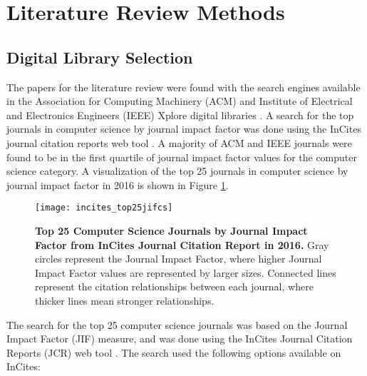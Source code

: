 



\appendix

\section{Literature Review Methods}  \label{appendix:literature-review-methods}

\subsection{Digital Library Selection} \label{appendix:digital-library-selection}

The papers for the literature review were found with the search engines available in the Association for Computing Machinery (ACM) \cite{ACM:2017} and Institute of Electrical and Electronics Engineers (IEEE) Xplore digital libraries \cite{IEEE:2017}. A search for the top journals in computer science by journal impact factor \cite{Garfield:2006b} was done using the InCites journal citation reports web tool \cite{Clarivate:2017a}. A majority of ACM and IEEE journals were found to be in the first quartile of journal impact factor values for the computer science category. A visualization of the top 25 journals in computer science by journal impact factor in 2016 is shown in Figure \ref{figure:incites_top25jifcs}.

\begin{figure}[!t]
	\centering
	\texttt{[image: incites\_top25jifcs]}
	\caption{\textbf{Top 25 Computer Science Journals by Journal Impact Factor from InCites Journal Citation Report in 2016.} Gray circles represent the Journal Impact Factor, where higher Journal Impact Factor values are represented by larger sizes. Connected lines represent the citation relationships between each journal, where thicker lines mean stronger relationships.}
	\label{figure:incites_top25jifcs}
\end{figure}

The search for the top 25 computer science journals was based on the Journal Impact Factor (JIF) \cite{Garfield:2006b} measure, and was done using the InCites Journal Citation Reports (JCR) web tool \cite{Clarivate:2017a}. The search used the following options available on InCites:

